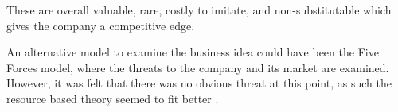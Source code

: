 These are overall valuable, rare, costly to imitate, and non-substitutable which gives the company a competitive edge.

An alternative model to examine the business idea could have been the Five Forces model, where the threats to the company and its market are examined.
However, it was felt that there was no obvious threat at this point, as such the resource based theory seemed to fit better \citep[pg. 16]{book:jrose}.


